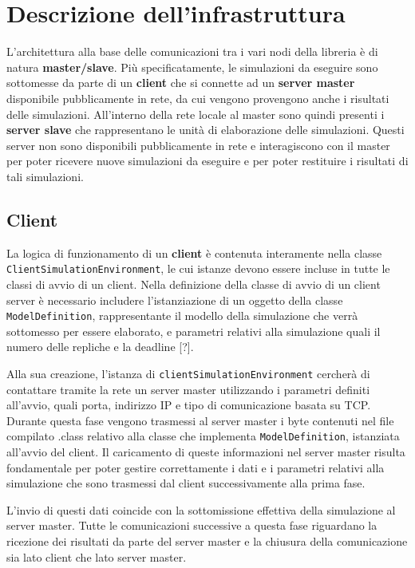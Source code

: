 
\section{Descrizione dell'infrastruttura}
L'architettura alla base delle comunicazioni tra i vari nodi della libreria è di natura \textbf{master/slave}.
Più specificatamente, le simulazioni da eseguire sono sottomesse da parte di un \textbf{client} che si connette ad un \textbf{server master} disponibile pubblicamente in rete, da cui vengono provengono anche i risultati delle simulazioni. 
All'interno della rete locale al master sono quindi presenti i \textbf{server slave} che rappresentano le unità di elaborazione delle simulazioni. Questi server non sono disponibili pubblicamente in rete e interagiscono con il master per poter ricevere nuove simulazioni da eseguire e per poter restituire i risultati di tali simulazioni.

\subsection{Client}
La logica di funzionamento di un \textbf{client} è contenuta interamente nella classe \texttt{ClientSimulationEnvironment}, le cui istanze devono essere incluse in tutte le classi di avvio di un client.
Nella definizione della classe di avvio di un client server è necessario includere l'istanziazione di un oggetto della classe \texttt{ModelDefinition}, rappresentante il modello della simulazione che verrà sottomesso per essere elaborato, e parametri relativi alla simulazione quali il numero delle repliche e la deadline [?].

Alla sua creazione, l'istanza di \texttt{clientSimulationEnvironment} cercherà di contattare tramite la rete un server master utilizzando i parametri definiti all'avvio, quali porta, indirizzo IP e tipo di comunicazione basata su TCP. 
Durante questa fase vengono trasmessi al server master i byte contenuti nel file compilato .class relativo alla classe che implementa \texttt{ModelDefinition}, istanziata all'avvio del client.
Il caricamento di queste informazioni nel server master risulta fondamentale per poter gestire correttamente i dati e i parametri relativi alla simulazione che sono trasmessi dal client successivamente alla prima fase.

L'invio di questi dati coincide con la sottomissione effettiva della simulazione al server master. 
Tutte le comunicazioni successive a questa fase riguardano la ricezione dei risultati da parte del server master e la chiusura della comunicazione sia lato client che lato server master.

